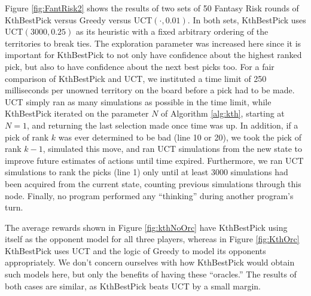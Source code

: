 \documentclass[letterpaper]{article}
\numberwithin{equation}{section}
\numberwithin{theorem}{section}
\numberwithin{lemma}{section}
\numberwithin{df}{section}
\begin{document}
Figure \ref{fig:FantRisk2} shows the results of two sets of 50 Fantasy Risk rounds of KthBestPick versus Greedy versus UCT$(\cdot, 0.01)$.  In both sets, KthBestPick uses UCT$(3000, 0.25)$ as its heuristic with a fixed arbitrary ordering of the territories to break ties.  The exploration parameter was increased here since it is important for KthBestPick to not only have confidence about the highest ranked pick, but also to have confidence about the next best picks too.  For a fair comparison of KthBestPick and UCT, we instituted a time limit of 250 milliseconds per unowned territory on the board before a pick had to be made.  UCT simply ran as many simulations as possible in the time limit, while KthBestPick iterated on the parameter $N$ of Algorithm \ref{alg:kth}, starting at $N=1$, and returning the last selection made once time was up.  In addition, if a pick of rank $k$ was ever determined to be bad (line 10 or 20), we took the pick of rank $k-1$, simulated this move, and ran UCT simulations from the new state to improve future estimates of actions until time expired.    Furthermore, we ran UCT simulations to rank the picks (line 1) only until at least 3000 simulations had been acquired from the current state, counting previous simulations through this node.  Finally, no program performed any ``thinking'' during another program's turn.

The average rewards shown in Figure \ref{fig:kthNoOrc} have KthBestPick using itself as the opponent model for all three players, whereas in Figure \ref{fig:KthOrc} KthBestPick uses UCT and the logic of Greedy to model its opponents appropriately.  We don't concern ourselves with how KthBestPick would obtain such models here, but only the benefits of having these ``oracles.''  The results of both cases are similar, as KthBestPick beats UCT by a small margin.
\end{document}
